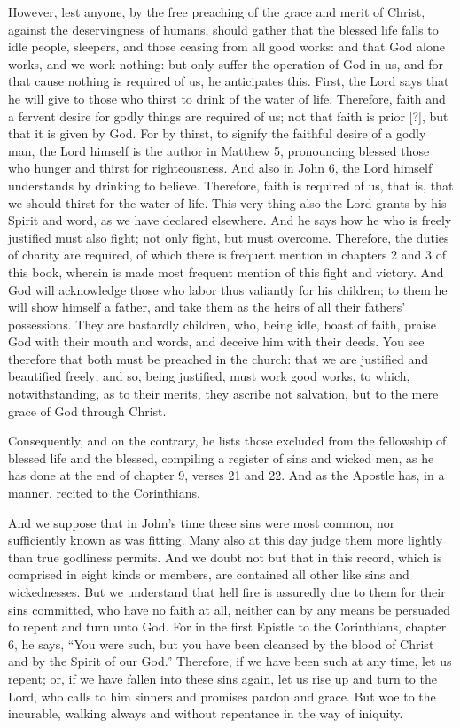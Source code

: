 However, lest anyone, by the free preaching of the grace and merit of Christ, against the deservingness of humans, should gather that the blessed life falls to idle people, sleepers, and those ceasing from all good works: and that God alone works, and we work nothing: but only suffer the operation of God in us, and for that cause nothing is required of us, he anticipates this. First, the Lord says that he will give to those who thirst to drink of the water of life. Therefore, faith and a fervent desire for godly things are required of us; not that faith is prior [?], but that it is given by God. For by thirst, to signify the faithful desire of a godly man, the Lord himself is the author in Matthew 5, pronouncing blessed those who hunger and thirst for righteousness. And also in John 6, the Lord himself understands by drinking to believe. Therefore, faith is required of us, that is, that we should thirst for the water of life. This very thing also the Lord grants by his Spirit and word, as we have declared elsewhere. And he says how he who is freely justified must also fight; not only fight, but must overcome. Therefore, the duties of charity are required, of which there is frequent mention in chapters 2 and 3 of this book, wherein is made most frequent mention of this fight and victory. And God will acknowledge those who labor thus valiantly for his children; to them he will show himself a father, and take them as the heirs of all their fathers’ possessions. They are bastardly children, who, being idle, boast of faith, praise God with their mouth and words, and deceive him with their deeds. You see therefore that both must be preached in the church: that we are justified and beautified freely; and so, being justified, must work good works, to which, notwithstanding, as to their merits, they ascribe not salvation, but to the mere grace of God through Christ.

Consequently, and on the contrary, he lists those excluded from the fellowship of blessed life and the blessed, compiling a register of sins and wicked men, as he has done at the end of chapter 9, verses 21 and 22. And as the Apostle has, in a manner, recited to the Corinthians.

And we suppose that in John’s time these sins were most common, nor sufficiently known as was fitting. Many also at this day judge them more lightly than true godliness permits. And we doubt not but that in this record, which is comprised in eight kinds or members, are contained all other like sins and wickednesses. But we understand that hell fire is assuredly due to them for their sins committed, who have no faith at all, neither can by any means be persuaded to repent and turn unto God. For in the first Epistle to the Corinthians, chapter 6, he says, “You were such, but you have been cleansed by the blood of Christ and by the Spirit of our God.” Therefore, if we have been such at any time, let us repent; or, if we have fallen into these sins again, let us rise up and turn to the Lord, who calls to him sinners and promises pardon and grace. But woe to the incurable, walking always and without repentance in the way of iniquity.

